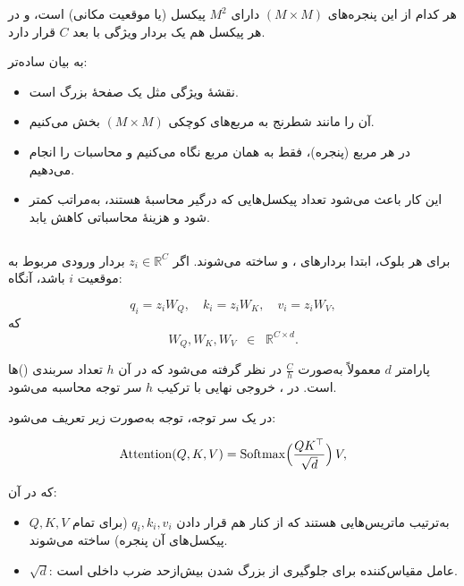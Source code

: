 هر کدام از این پنجره‌های 
\(\displaystyle (M \times M)\) 
دارای 
\(\displaystyle M^2\) پیکسل (یا موقعیت مکانی) است، 
و در هر پیکسل هم یک بردار ویژگی با بعد \(\displaystyle C\) قرار دارد.

به بیان ساده‌تر:
\begin{itemize}
	\item نقشهٔ ویژگی مثل یک صفحهٔ بزرگ است.
	\item آن را مانند شطرنج به مربع‌های کوچکی \(\displaystyle (M \times M)\) بخش می‌کنیم.
	\item در هر مربع (پنجره)، فقط به همان مربع نگاه می‌کنیم و محاسبات  را انجام می‌دهیم.
	\item این کار باعث می‌شود تعداد پیکسل‌هایی که درگیر محاسبهٔ  هستند، 
	به‌مراتب کمتر شود و هزینهٔ محاسباتی کاهش یابد.
\end{itemize}


\subsection{}

برای هر بلوک، ابتدا بردارهای \textbf{}، \textbf{} و \textbf{} ساخته می‌شوند. 
اگر \(\displaystyle z_i \in \mathbb{R}^C\) بردار ورودی مربوط به موقعیت \(i\) باشد، آنگاه:

\[
q_i = z_i W_Q, 
\quad
k_i = z_i W_K,
\quad
v_i = z_i W_V,
\]
که 
\[
W_Q, W_K, W_V \;\;\in \;\;\mathbb{R}^{C \times d}.
\]

پارامتر \(\displaystyle d\) معمولاً به‌صورت \(\displaystyle \tfrac{C}{h}\) در نظر گرفته می‌شود 
که در آن \(\displaystyle h\) تعداد سربندی ()ها است. 
در \textbf{}، خروجی نهایی با ترکیب \(\displaystyle h\) سر توجه محاسبه می‌شود.

در یک سر توجه، توجه به‌صورت زیر تعریف می‌شود:

\[
\mathrm{Attention}(Q, K, V)
=
\mathrm{Softmax}\Bigl(\frac{QK^\top}{\sqrt{d}}\Bigr)\,V,
\]

که در آن:

\begin{itemize}
	\item \(\displaystyle Q, K, V\) به‌ترتیب ماتریس‌هایی هستند که از کنار هم قرار دادن 
	\(\displaystyle q_i, k_i, v_i\) (برای تمام پیکسل‌های آن پنجره) ساخته می‌شوند.
	\item \(\displaystyle \sqrt{d}\): عامل مقیاس‌کننده برای جلوگیری از بزرگ شدن بیش‌ازحد ضرب داخلی است.
\end{itemize}


